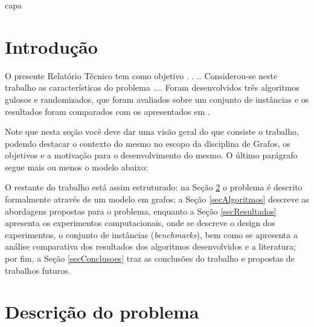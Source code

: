 \documentclass[12pt,fleqn]{article}
\begin{document}
\pagestyle {empty}

 {capa}           %



\pagestyle {empty}

\newpage



\pagestyle {plain}



\setcounter{page}{0} 
 
\setlength{\parindent}{0in}  %
\parskip 5pt  

\section{Introdução}

O presente Relatório Técnico tem como objetivo . . .. Considerou-se neste trabalho as características do problema  .... Foram desenvolvidos três algoritmos gulosos e randomizados, que foram avaliados sobre um conjunto de instâncias e os resultados foram comparados com os apresentados em \cite{moradi2015semi}.

Note que nesta seção você deve dar uma visão geral do que consiste o trabalho, podendo destacar o contexto do mesmo no escopo da disciplina de Grafos, os objetivos e a motivação para o desenvolvimento do mesmo. O último parágrafo segue mais ou menos o modelo abaixo:

O restante do trabalho está assim estruturado: na Seção \ref{secProblema} o problema é descrito formalmente através de um modelo em grafos; a Seção \ref{secAlgoritmos} descreve as abordagens propostas para o problema, enquanto a Seção \ref{secResultados} apresenta os experimentos computacionais, onde se descreve o design dos experimentos, o conjunto de instâncias (\textit{benchmarks}), bem como se apresenta a análise comparativa dos resultados dos algoritmos desenvolvidos e a literatura; por fim, a Seção \ref{secConclusoes} traz as conclusões do trabalho e propostas de trabalhos futuros.

\section{Descrição do problema}
\label{secProblema}
 
\end{document}
